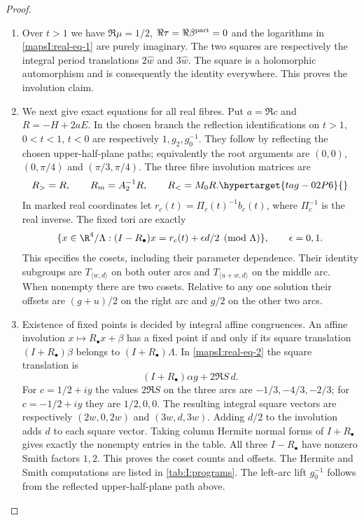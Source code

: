 \begin{proof}
\begin{enumerate}[label=\arabic*.,leftmargin=*]
\item Over $t>1$ we have
$\Re\mu=1/2$, $\Re\tau=\Re\beta^{\rm part}=0$ and the logarithms in
\eqref{mapsI:real-eq-1} are purely imaginary. The two squares are respectively the
integral period translations $2\widehat w$ and $3\widehat w$.
The square is a holomorphic automorphism and is consequently the
identity everywhere. This proves the involution claim.

\item We next give exact equations for all real fibres. Put $a=\Re c$ and
$R=-H+2aE$. In the chosen branch the reflection identifications on
$t>1$, $0<t<1$, $t<0$ are respectively $1,g_2,g_0^{-1}$.
They follow by reflecting the chosen upper-half-plane paths; equivalently
the root arguments are $(0,0)$, $(0,\pi/4)$ and $(\pi/3,\pi/4)$.
The three fibre involution matrices are
\[
 R_>=R,\qquad R_m=A_2^{-1}R,\qquad R_<=M_0R.
 \hypertarget{tag-02P6}{}\label{mapsI:real-eq-5}
\]
In marked real coordinates let $r_c(t)=\Pi_c(t)^{-1}b_c(t)$,
where $\Pi_c^{-1}$ is the real inverse. The fixed tori are exactly
\[
 \{x\in\R^4/\Lambda:(I-R_\bullet)x=
                       r_c(t)+\epsilon d/2\pmod\Lambda\},
 \qquad\epsilon=0,1.
 \label{mapsI:real-eq-6}
\]
This specifies the cosets, including their parameter dependence. Their
identity subgroups are $T_{\langle w,d\rangle}$ on both outer arcs and
$T_{\langle u+w,d\rangle}$ on the middle arc. When nonempty there are
two cosets. Relative to any one solution their offsets are
$(g+u)/2$ on the right arc and $g/2$ on the other two arcs.

\item Existence of fixed points is decided by integral affine congruences. An affine involution
$x\mapsto R_\bullet x+\beta$ has a fixed point if and only if its
square translation $(I+R_\bullet)\beta$ belongs to
$(I+R_\bullet)\Lambda$. In \eqref{mapsI:real-eq-2} the square translation is
\[
 (I+R_\bullet)\alpha g+2\Re S\,d.
\]
For $c=1/2+iy$ the values $2\Re S$ on the three arcs are
$-1/3,-4/3,-2/3$; for $c=-1/2+iy$ they are $1/2,0,0$.
The resulting integral square vectors are respectively
$(2w,0,2w)$ and $(3w,d,3w)$. Adding $d/2$ to the involution adds $d$
to each square vector. Taking column Hermite normal forms of
$I+R_\bullet$ gives exactly the nonempty entries in the table.
All three $I-R_\bullet$ have nonzero Smith factors $1,2$.
This proves the coset counts and offsets. The Hermite and Smith
computations are listed in \cref{tab:I:programs}. The left-arc lift
$g_0^{-1}$ follows from the reflected upper-half-plane path above.


\end{enumerate}
\end{proof}
